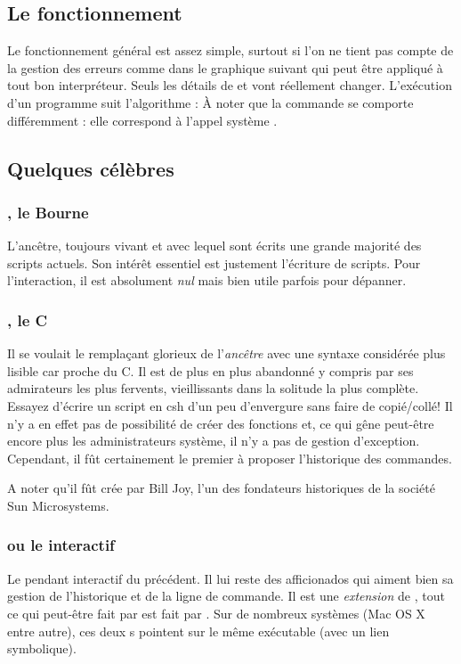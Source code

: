 \subsection{Le fonctionnement}
Le fonctionnement général est assez simple, surtout si l'on ne tient pas compte de la gestion des erreurs comme dans le graphique suivant qui peut être appliqué à tout bon interpréteur. Seuls les détails de  et  vont réellement changer.
L'exécution d'un programme suit l'algorithme :
À noter que la commande  se comporte différemment : elle correspond à l'appel système .

\subsection{Quelques \shells{} célèbres}
\subsubsection{\sh{}, le Bourne \shell{}}
L'ancêtre, toujours vivant et avec lequel sont écrits une grande majorité des scripts actuels. Son intérêt essentiel est justement l'écriture de scripts. Pour l'interaction, il est absolument \emph{nul} mais bien utile parfois pour dépanner.

\subsubsection{\csh{}, le C \shell{}}
Il se voulait le remplaçant glorieux de l'\emph{ancêtre} \sh{} avec une syntaxe considérée plus lisible car proche du C. Il est de plus en plus abandonné y compris par ses admirateurs les plus fervents, vieillissants dans la solitude la plus complète. Essayez d'écrire un script en csh d'un peu d'envergure sans faire de copié/collé! Il n'y a en effet pas de possibilité de créer des fonctions et, ce qui gêne peut-être encore plus les administrateurs système, il n'y a pas de gestion d'exception.  Cependant, il fût certainement le premier à proposer l'historique des commandes.

A noter qu'il fût crée par Bill Joy, l'un des fondateurs historiques de la société Sun Microsystems.

\subsubsection{\tcsh{} ou le \csh{} interactif}
Le pendant interactif du précédent. Il lui reste des afficionados qui aiment bien sa gestion de l'historique et de la ligne de commande.  Il est une \emph{extension} de \csh{}, \ie tout ce qui peut-être fait par \csh{} est fait par \tcsh{}. Sur de nombreux systèmes (Mac OS X  entre autre), ces deux \shell{}s pointent sur le même exécutable (avec un lien symbolique).

